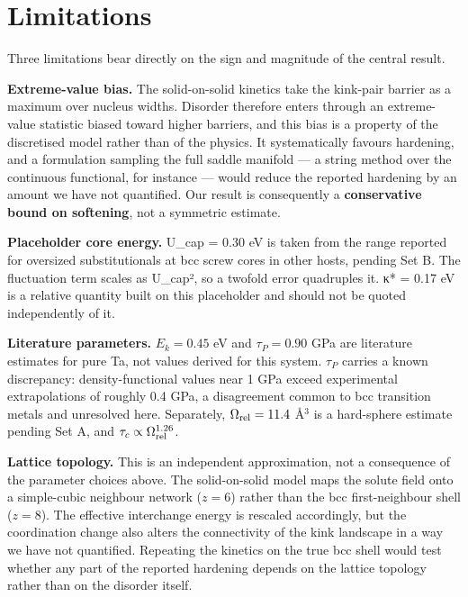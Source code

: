 \hypertarget{limitations}{%
\section{Limitations}\label{sec:limitations}}

Three limitations bear directly on the sign and magnitude of the central result.

\textbf{Extreme-value bias.} The solid-on-solid kinetics take the kink-pair barrier as a maximum over nucleus widths. Disorder therefore enters through an extreme-value statistic biased toward higher barriers, and this bias is a property of the discretised model rather than of the physics. It systematically favours hardening, and a formulation sampling the full saddle manifold --- a string method over the continuous functional, for instance --- would reduce the reported hardening by an amount we have not quantified. Our result is consequently a \textbf{conservative bound on softening}, not a symmetric estimate.

\textbf{Placeholder core energy.} U\_cap = 0.30 eV is taken from the range reported for oversized substitutionals at bcc screw cores in other hosts, pending Set B. The fluctuation term scales as U\_cap², so a twofold error quadruples it. κ* = 0.17 eV is a relative quantity built on this placeholder and should not be quoted independently of it.

\textbf{Literature parameters.} \(E_k = 0.45\) eV and \(\tau_P = 0.90\) GPa are literature estimates for pure Ta, not values derived for this system. \(\tau_P\) carries a known discrepancy: density-functional values near 1 GPa exceed experimental extrapolations of roughly 0.4 GPa, a disagreement common to bcc transition metals and unresolved here. Separately, \(\Omega_{\rm rel} = 11.4\) \AA\(^3\) is a hard-sphere estimate pending Set A, and \(\tau_c \propto \Omega_{\rm rel}^{1.26}\).

\textbf{Lattice topology.} This is an independent approximation, not a consequence of the parameter choices above. The solid-on-solid model maps the solute field onto a simple-cubic neighbour network (\(z=6\)) rather than the bcc first-neighbour shell (\(z=8\)). The effective interchange energy is rescaled accordingly, but the coordination change also alters the connectivity of the kink landscape in a way we have not quantified. Repeating the kinetics on the true bcc shell would test whether any part of the reported hardening depends on the lattice topology rather than on the disorder itself.

